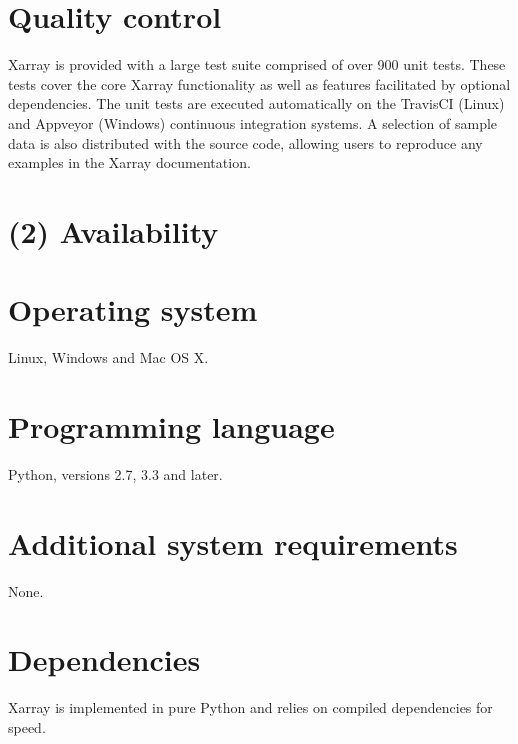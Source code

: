 \documentclass{jors}
\begin{document}
\section*{Quality control}


Xarray is provided with a large test suite comprised of over 900 unit tests.
These tests cover the core Xarray functionality as well as features facilitated by optional dependencies.
The unit tests are executed automatically on the TravisCI (Linux) \citep{TravisCI} and Appveyor (Windows) \citep{Appveyor} continuous integration systems.
A selection of sample data is also distributed with the source code, allowing users to reproduce any examples in the Xarray documentation.

\section*{(2) Availability}
\vspace{0.5cm}
\section*{Operating system}

Linux, Windows and Mac OS X.

\section*{Programming language}

Python, versions 2.7, 3.3 and later.

\section*{Additional system requirements}

None.

\section*{Dependencies}

Xarray is implemented in pure Python and relies on compiled dependencies for
speed.
\end{document}
